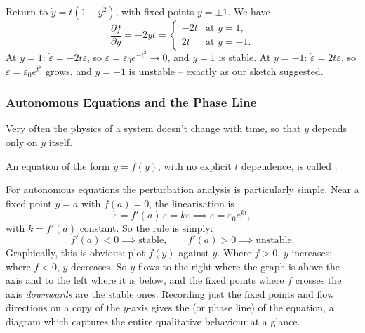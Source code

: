 \begin{example}
	Return to $\dot y = t(1 - y^2)$, with fixed points $y = \pm 1$. We have
	$$
	\frac{\partial f}{\partial y} = -2yt = \begin{cases} -2t & \text{at } y = 1, \\ 2t & \text{at } y = -1. \end{cases}
	$$
	At $y = 1$: $\dot\varepsilon = -2t \varepsilon$, so $\varepsilon = \varepsilon_0 e^{-t^2} \to 0$, and $y = 1$ is stable. At $y = -1$: $\dot\varepsilon = 2t\varepsilon$, so $\varepsilon = \varepsilon_0 e^{t^2}$ grows, and $y = -1$ is unstable -- exactly as our sketch suggested.
\end{example}

\subsubsection{Autonomous Equations and the Phase Line}

Very often the physics of a system doesn't change with time, so that $\dot y$ depends only on $y$ itself.

\begin{definition}
	An equation of the form $\dot{y} = f(y)$, with no explicit $t$ dependence, is called .
\end{definition}

For autonomous equations the perturbation analysis is particularly simple. Near a fixed point $y = a$ with $f(a) = 0$, the linearisation is
$$
\dot\varepsilon = f'(a) \, \varepsilon = k \varepsilon \implies \varepsilon = \varepsilon_0 e^{kt},
$$
with $k = f'(a)$ constant. So the rule is simply:
$$
f'(a) < 0 \implies \text{stable}, \qquad f'(a) > 0 \implies \text{unstable}.
$$
Graphically, this is obvious: plot $f(y)$ against $y$. Where $f > 0$, $y$ increases; where $f < 0$, $y$ decreases. So $y$ flows to the right where the graph is above the axis and to the left where it is below, and the fixed points where $f$ crosses the axis \emph{downwards} are the stable ones. Recording just the fixed points and flow directions on a copy of the $y$-axis gives the  (or phase line) of the equation, a diagram which captures the entire qualitative behaviour at a glance.

